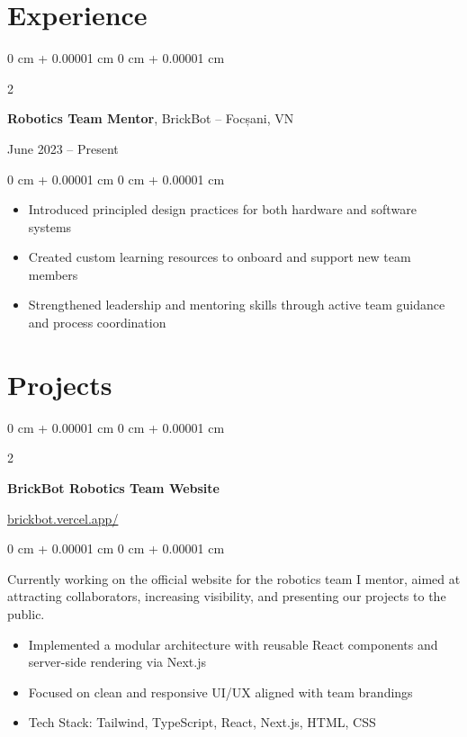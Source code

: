 \documentclass[10pt, letterpaper]{article}
\newenvironment{highlights}{
    \begin{itemize}[
        topsep=0.10 cm,
        parsep=0.10 cm,
        partopsep=0pt,
        itemsep=0pt,
        leftmargin=0 cm + 10pt
    ]
}{
    \end{itemize}
} %
\newenvironment{onecolentry}{
    \begin{adjustwidth}{
        0 cm + 0.00001 cm
    }{
        0 cm + 0.00001 cm
    }
}{
    \end{adjustwidth}
} %
\newenvironment{twocolentry}[2][]{
    \onecolentry
    \def\secondColumn{#2}
    \setcolumnwidth{\fill, 4.5 cm}
    \begin{paracol}{2}
}{
    \switchcolumn \raggedleft \secondColumn
    \end{paracol}
    \endonecolentry
} %
\begin{document}
    \section{Experience}
        
        \begin{twocolentry}{
    June 2023 – Present
}
    \textbf{Robotics Team Mentor}, BrickBot -- Focșani, VN
\end{twocolentry}

\vspace{0.10 cm}
\begin{onecolentry}
    \begin{highlights}
        \item Introduced principled design practices for both hardware and software systems
        \item Created custom learning resources to onboard and support new team members
        \item Strengthened leadership and mentoring skills through active team guidance and process coordination
    \end{highlights}
\end{onecolentry}


    
    \section{Projects}

        \begin{twocolentry}{
    \href{https://brickbot.vercel.app/en/home}{brickbot.vercel.app/}
}
    \textbf{BrickBot Robotics Team Website}
\end{twocolentry}

\vspace{0.10 cm}
\begin{onecolentry}
    Currently working on the official website for the robotics team I mentor, aimed at attracting collaborators, increasing visibility, and presenting our projects to the public.

    \begin{highlights}
        \item Implemented a modular architecture with reusable React components and server-side rendering via Next.js
        \item Focused on clean and responsive UI/UX aligned with team brandings
        \item Tech Stack: Tailwind, TypeScript, React, Next.js, HTML, CSS
    \end{highlights}
\end{onecolentry}
\end{document}
